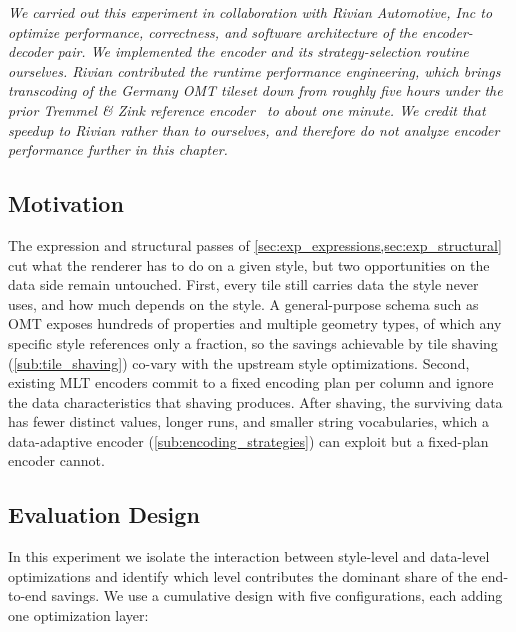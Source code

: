 \textit{We carried out this experiment in collaboration with Rivian Automotive, Inc to optimize performance, correctness, and software architecture of the encoder-decoder pair.
We implemented the encoder and its strategy-selection routine ourselves.
Rivian contributed the runtime performance engineering, which brings transcoding of the Germany \ac{OMT} tileset down from roughly five hours under the prior Tremmel \& Zink reference encoder~\cite{tremmelMapLibreTileNext2025b} to about one minute.
We credit that speedup to Rivian rather than to ourselves, and therefore do not analyze encoder performance further in this chapter.}

\subsection{Motivation}\label{sub:mlt_problem}

The expression and structural passes of \cref{sec:exp_expressions,sec:exp_structural} cut what the renderer has to do on a given style, but two opportunities on the data side remain untouched.
First, every tile still carries data the style never uses, and how much depends on the style.
A general-purpose schema such as \ac{OMT} exposes hundreds of properties and multiple geometry types, of which any specific style references only a fraction, so the savings achievable by tile shaving (\cref{sub:tile_shaving}) co-vary with the upstream style optimizations.
Second, existing \ac{MLT} encoders commit to a fixed encoding plan per column and ignore the data characteristics that shaving produces.
After shaving, the surviving data has fewer distinct values, longer runs, and smaller string vocabularies, which a data-adaptive encoder (\cref{sub:encoding_strategies}) can exploit but a fixed-plan encoder cannot.

\subsection{Evaluation Design}\label{sub:mlt_evaluation}

In this experiment we isolate the interaction between style-level and data-level optimizations and identify which level contributes the dominant share of the end-to-end savings.
We use a cumulative design with five configurations, each adding one optimization layer:

